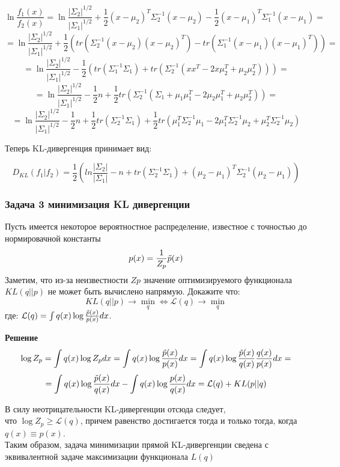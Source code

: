 \[
\ln \frac{f_1(x)}{f_2(x)} = \ln \frac{|\Sigma_2|^{1/2}}{|\Sigma_1|^{1/2}} + \frac{1}{2}(x - \mu_2)^T \Sigma_2^{-1} (x - \mu_2) - \frac{1}{2}(x - \mu_1)^T \Sigma_1^{-1} (x - \mu_1) =  \]
\[
= \ln \frac{|\Sigma_2|^{1/2}}{|\Sigma_1|^{1/2}} + \frac{1}{2}(tr(\Sigma_2^{-1}(x - \mu_2)(x - \mu_2)^T) - tr(\Sigma_1^{-1}(x - \mu_1)(x - \mu_1)^T)) = 
\]
\[
= \ln \frac{|\Sigma_2|^{1/2}}{|\Sigma_1|^{1/2}} -\frac{1}{2}(tr(\Sigma_1^{-1}\Sigma_1) + tr(\Sigma_2^{-1}(xx^T - 2x \mu_2^T + \mu_2 \mu_2^T))) =
\]
\[
= \ln \frac{|\Sigma_2|^{1/2}}{|\Sigma_1|^{1/2}} -\frac{1}{2}n + \frac{1}{2} tr(\Sigma_2^{-1} (\Sigma_1 + \mu_1 \mu_1^T - 2\mu_2 \mu_1^T + \mu_2 \mu_2 ^T)) = 
\]
\[
 = \ln \frac{|\Sigma_2|^{1/2}}{|\Sigma_1|^{1/2}}  - \frac{1}{2}n  + \frac{1}{2}tr(\Sigma_2^{-1}\Sigma_1) + \frac{1}{2}tr(\mu_1^T \Sigma_2^{-1} \mu_1 - 2\mu_1^T \Sigma_2^{-1} \mu_2 + \mu_2^T\Sigma_2^{-1}\mu_2) 
\]

Теперь KL-дивергенция принимает вид:

\[
D_{KL}(f_1 | f_2) = \frac{1}{2} (ln\frac{|\Sigma_2|}{|\Sigma_1|} - n + tr(\Sigma_2^{-1}\Sigma_1) + (\mu_2 - \mu_1)^T\Sigma_2^{-1}(\mu_2 - \mu_1))
\]

\subsubsection*{Задача 3 минимизация KL дивергенции}
Пусть имеется некоторое вероятностное распределение, известное с точностью до нормировачной константы 
\[p(x) = \frac{1}{Z_p}\Tilde{p}(x) \]
Заметим, что из-за неизвестности $Zp$ значение оптимизируемого
функционала $KL(q||p)$ не может быть вычислено напрямую.
Докажите что: 
\[KL(q||p) \rightarrow \underset{q}{\min} \Leftrightarrow \mathcal{L}(q) \rightarrow \underset{q}{\min}\] 
где: $\mathcal{L}(q) = \int q(x) \log \frac{\Tilde{p}(x)}{p(x)}dx$.


\textbf{Решение}
\[
\log Z_p = \int q(x) \log Z_pdx  = \int q(x) \log \frac{\Tilde{p}(x)}{p(x)}dx = \int q(x) \log \frac{\Tilde{p}(x)}{q(x)}\frac{q(x)}{p(x)}dx
= \]
\[
= \int q(x) \log \frac{\Tilde{p}(x)}{q(x)}dx - \int q(x) \log \frac{p(x)}{q(x)}dx = \mathcal{L}(q) + KL(p||q)
\]

В силу неотрицательности KL-дивергенции отсюда следует,\\ что $\log Z_p \geq \mathcal{L}(q)$, причем равенство
достигается тогда и только тогда, когда $q(x) \equiv p(x)$. \\ 
Таким образом, задача минимизации прямой KL-дивергенции сведена с эквивалентной задаче максимизации функционала $L(q)$


